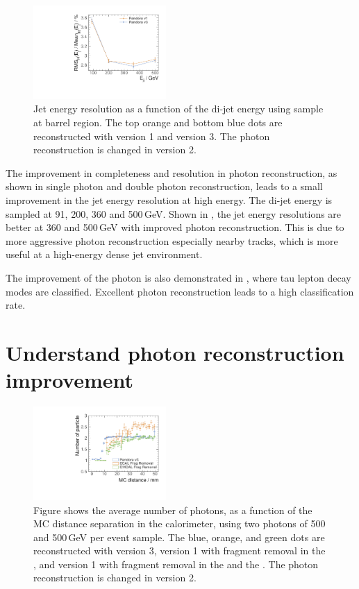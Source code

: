 \begin{figure}[tbph]
\centering
\includegraphics[width=0.45\textwidth]{photon/JERnew.pdf}
\caption[Jet energy resolution as a function of the di-jet energy]
{Jet energy resolution as a function of the di-jet energy using \Zuds sample at barrel region. The top orange and bottom blue dots are reconstructed with \pandora version 1 and version 3. The photon reconstruction is changed in \pandora version 2.}
\label{fig:photonJER}
\end{figure}

The improvement in completeness and resolution in photon reconstruction, as shown in single photon and double photon reconstruction, leads to a small improvement in the jet energy resolution at high energy. The di-jet energy is sampled at 91, 200, 360 and 500\,GeV. Shown in , the jet energy resolutions are better at 360 and 500\,GeV with improved photon reconstruction. This is due to more aggressive photon reconstruction especially nearby tracks, which is more useful at a high-energy dense jet environment.

The improvement of the photon is also demonstrated in , where tau lepton decay modes are classified. Excellent photon reconstruction leads to a high classification rate.

\section{Understand photon reconstruction improvement}



\begin{figure}[tbph]
\centering
\includegraphics[width=0.45\textwidth]{photon/DoubleCompareAlgs.pdf}
\caption[Average number of photons, as a function of the MC distance separation for different algorithms combinations.]
{Figure shows the average number of photons, as a function of the MC distance separation in the calorimeter, using two photons of 500 and 500\,GeV per event sample. The blue, orange, and green dots are reconstructed with \pandora version 3, \pandora version 1 with fragment removal in the \ECAL, and \pandora version 1 with fragment removal in the \ECAL and the \HCAL. The photon reconstruction is changed in \pandora version 2.}
\label{fig:photonDoubleCompareAlgs}
\end{figure}

